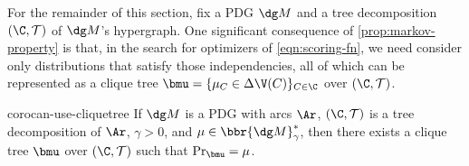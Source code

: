 For the remainder of this section, fix a PDG $\dg M$ and a tree decomposition $(\C, \mathcal T)$ of $\dg M$'s hypergraph.
One significant consequence of \cref{prop:markov-property} is that, in the
search for optimizers of \eqref{eqn:scoring-fn}, we
need consider only distributions that satisfy those independencies,
all of which can be represented as a clique tree
$\bmu = \{\mu_C \in \Delta\V(C) \}_{C \in \C}$
over $(\C, \mathcal T)$.

\begin{linked}{coro}{can-use-cliquetree}
    If $\dg M$ is a PDG with arcs $\Ar$, 
    $(\C, \mathcal T)$ is a tree decomposition of $\Ar$,
    $\gamma > 0$, and
    $\mu \in \bbr{\dg M}^*_\gamma$, then there exists a clique tree
    $\bmu$ over $(\C, \mathcal T)$ such that $\Pr_{\bmu} = \mu$.
\end{linked}

